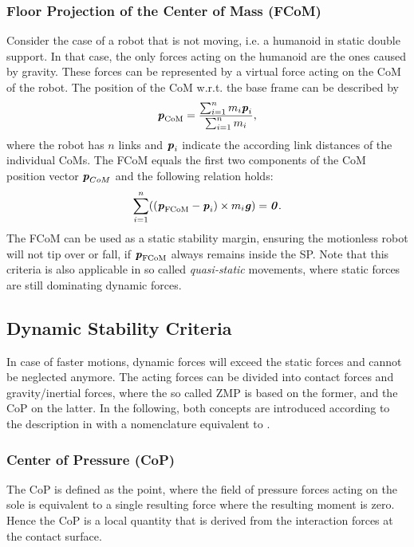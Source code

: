 \subsubsection{Floor Projection of the Center of Mass (FCoM)}
Consider the case of a robot that is not moving, i.e. a humanoid in static double support. In that case, the only forces acting on the humanoid are the ones caused by gravity. These forces can be represented by a virtual force acting on the \gls{CoM} of the robot. The position of the \gls{CoM} w.r.t. the base frame can be described by
\begin{equation*} 
\bm{\mathit{p}}_{\text{CoM}}=\dfrac{\sum_{i=1}^{n}m_i\bm{\mathit{p}}_i}{\sum_{i=1}^{n}m_i},
\end{equation*}
where the robot has $n$ links and $\bm{\mathit{p}}_i$ indicate the according link distances of the individual \gls{CoM}s. The \gls{FCoM} equals the first two components of the \gls{CoM} position vector $\bm{\mathit{p}}_{CoM}$ and the following relation holds:
\begin{equation*} 
\sum_{i=1}^{n}((\bm{\mathit{p}}_{\text{FCoM}}-\bm{\mathit{p}}_i)\times m_i\bm{\mathit{g}})=\bm{\mathit{0}}.
\end{equation*}
The \gls{FCoM} can be used as a static stability margin, ensuring the motionless robot will not tip over or fall, if $\bm{\mathit{p}}_{\text{FCoM}}$ always remains inside the \gls{SP}. Note that this criteria is also applicable in so called \textit{quasi-static} movements, where static forces are still dominating dynamic forces.

\subsection{Dynamic Stability Criteria}
In case of faster motions, dynamic forces will exceed the static forces and cannot be neglected anymore. The acting forces can be divided into contact forces and gravity/inertial forces, where the so called \gls{ZMP} is based on the former, and the \gls{CoP} on the latter. In the following, both concepts are introduced according to the description in \cite{sardain2004forces} with a nomenclature equivalent to \cite{scaronTeaching}.
\subsubsection{Center of Pressure (CoP)}
The \gls{CoP} is defined as the point, where the field of pressure forces acting on the sole is equivalent to a single resulting force where the resulting moment is zero. Hence the \gls{CoP} is a local quantity that is derived from the interaction forces at the contact surface. 

